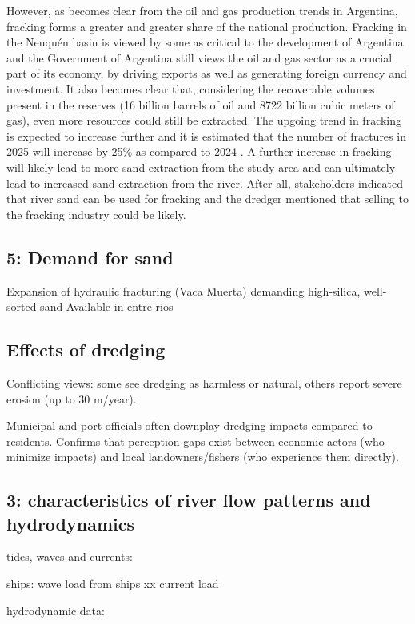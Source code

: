 However, as becomes clear from the oil and gas production trends in Argentina, fracking forms a greater and greater share of the national production. Fracking in the Neuquén basin is viewed by some as critical to the development of Argentina and the Government of Argentina still views the oil and gas sector as a crucial part of its economy, by driving exports as well as generating foreign currency and investment. It also becomes clear that, considering the recoverable volumes present in the reserves (16 billion barrels of oil and 8722 billion cubic meters of gas), even more resources could still be extracted. The upgoing trend in fracking is expected to increase further and it is estimated that the number of fractures in 2025 will increase by 25\% as compared to 2024 \autocite{berneda}. A further increase in fracking will likely lead to more sand extraction from the study area and can ultimately lead to increased sand extraction from the river. After all, stakeholders indicated that river sand can be used for fracking and the dredger mentioned that selling to the fracking industry could be likely.

\subsection{5: Demand for sand}
Expansion of hydraulic fracturing (Vaca Muerta) demanding high-silica, well-sorted sand
Available in entre rios

\subsection{Effects of dredging}
Conflicting views: some see dredging as harmless or natural, others report severe erosion (up to 30 m/year).

Municipal and port officials often downplay dredging impacts compared to residents.
Confirms that perception gaps exist between economic actors (who minimize impacts) and local landowners/fishers (who experience them directly).

\subsection{3: characteristics of river flow patterns and hydrodynamics}
tides, waves and currents: 

ships: wave load from ships xx
current load

hydrodynamic data: 


